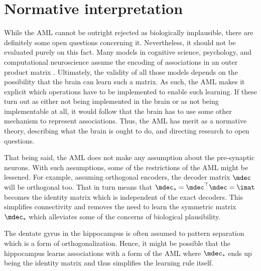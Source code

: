 \section{Normative interpretation}
While the AML cannot be outright rejected as biologically implausible, there are definitely some open questions concerning it.
Nevertheless, it should not be evaluated purely on this fact.
Many models in cognitive science, psychology, and computational neuroscience assume the encoding of associations in an outer product matrix \parencite[e.g.,][]{kajic2017,nowak2001}.
Ultimately, the validity of all those models depends on the possibility that the brain can learn such a matrix.
As such, the AML makes it explicit which operations have to be implemented to enable such learning.
If these turn out as either not being implemented in the brain or as not being implementable at all, it would follow that the brain has to use some other mechanism to represent associations.
Thus, the AML has merit as a normative theory, describing what the brain is ought to do, and directing research to open questions.

That being said, the AML does not make any assumption about the pre-synaptic neurons.
With such assumptions, some of the restrictions of the AML might be lessened.
For example, assuming orthogonal encoders, the decoder matrix $\mdec$ will be orthogonal too.
That in turn means that $\mdec_* = \mdec\Tr \mdec = \imat$ becomes the identity matrix which is independent of the exact decoders.
This simplifies connectivity and removes the need to learn the symmetric matrix $\mdec_*$ which alleviates some of the concerns of biological plausibility.

The dentate gyrus in the hippocampus is often assumed to pattern separation which is a form of orthogonalization.
Hence, it might be possible that the hippocampus learns associations with a form of the AML where $\mdec_*$ ends up being the identity matrix and thus simplifies the learning rule itself.


